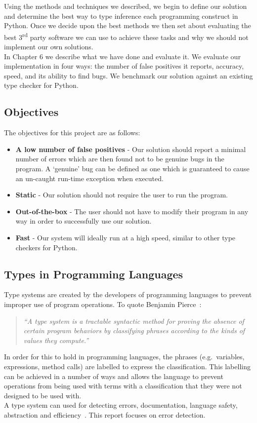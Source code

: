 \documentclass[12pt, titlepage]{article}
\begin{document}
\indent Using the methods and techniques we described, we begin to define our solution and determine the best way to type inference each programming construct in Python. Once we decide upon the best methods we then set about evaluating the best 3\textsuperscript{rd} party software we can use to achieve these tasks and why we should not implement our own solutions. \\
\indent In Chapter 6 we describe what we have done and evaluate it. We evaluate our implementation in four ways: the number of false positives it reports, accuracy, speed, and its ability to find bugs. We benchmark our solution against an existing type checker for Python.

\subsection{Objectives}
The objectives for this project are as follows:
\begin{itemize}
	\item \textbf{A low number of false positives} - Our solution should report a minimal number of errors which are then found not to be genuine bugs in the program. A `genuine' bug can be defined as one which is guaranteed to cause an un-caught run-time exception when executed.
	\item \textbf{Static} - Our solution should not require the user to run the program.
	\item \textbf{Out-of-the-box} - The user should not have to modify their program in any way in order to successfully use our solution.
	\item \textbf{Fast} - Our system will ideally run at a high speed, similar to other type checkers for Python.
\end{itemize} 

\subsection{Types in Programming Languages}
Type systems are created by the developers of programming languages to prevent improper use of program operations. To quote Benjamin Pierce~\cite{pierce02}:
\begin{quote}
	\emph{``A type system is a tractable syntactic method for proving the absence of certain program behaviors by classifying phrases according to the kinds of values they compute.''}
\end{quote}
In order for this to hold in programming languages, the phrases (e.g.\ variables, expressions, method calls) are labelled to express the classification. This labelling can be achieved in a number of ways and allows the language to prevent operations from being used with terms with a classification that they were not designed to be used with. \\
\indent A type system can used for detecting errors, documentation, language safety, abstraction and efficiency~\cite{pierce02}. This report focuses on error detection.
\end{document}

